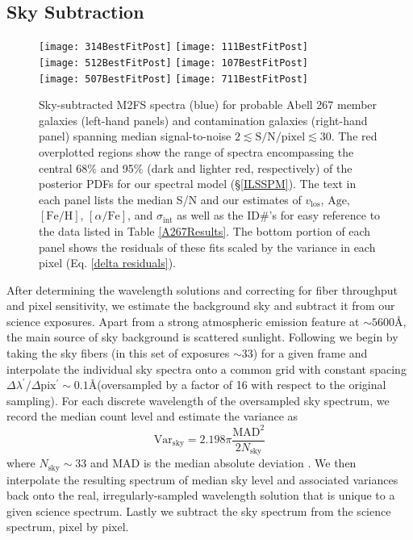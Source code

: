 \documentclass[twocolumn]{aastex6}
\def\feh{\mathrm{[Fe/H]}}
\def\afe{[\alpha/\mathrm{Fe}]}
\def\vlos{v_\mathrm{los}}
\def\disp{\sigma_\mathrm{int}}
\begin{document}
\subsection{Sky Subtraction}
\label{sky subtraction}

\begin{figure*}
\centering
\texttt{[image: 314BestFitPost]}
\texttt{[image: 111BestFitPost]}\\
\texttt{[image: 512BestFitPost]}
\texttt{[image: 107BestFitPost]}\\
\texttt{[image: 507BestFitPost]}
\texttt{[image: 711BestFitPost]}
\caption{Sky-subtracted M2FS spectra (blue) for probable Abell 267 member galaxies (left-hand panels) and contamination galaxies (right-hand panel) spanning median signal-to-noise $2\lesssim\mathrm{S/N/pixel}\lesssim30$. The red overplotted regions show the range of spectra encompassing the central 68\% and 95\% (dark and lighter red, respectively) of the posterior PDFs for our spectral model (\S\ref{ILSSPM}).  The text in each panel lists the median S/N and our estimates of $\vlos$, $\mathrm{Age}$, $\feh$, $\afe$, and $\disp$ as well as the ID\#'s for easy reference to the data listed in Table \ref{A267Results}. The bottom portion of each panel shows the residuals of these fits scaled by the variance in each pixel (Eq. \ref{delta residuals}).}
\label{A267BestFits}
\end{figure*}

After determining the wavelength solutions and correcting for fiber throughput and pixel sensitivity, we estimate the background sky and subtract it from our science exposures.
Apart from a strong atmospheric emission feature at $\sim5600$\AA, the main source of sky background is scattered sunlight.
Following \citet{Koposov2011} we begin by taking the sky fibers (in this set of exposures $\sim33$) for a given frame and interpolate the individual sky spectra onto a common grid with constant spacing $\Delta\lambda^\prime/\Delta\mathrm{pix}^\prime\sim0.1$\AA (oversampled by a factor of 16 with respect to the original sampling).
For each discrete wavelength of the oversampled sky spectrum, we record the median count level and estimate the variance as
\begin{equation}
\label{skyvar}
\mathrm{Var_{sky}}=2.198\pi\frac{\mathrm{MAD}^2}{2N_\mathrm{sky}}
\end{equation}
where $N_\mathrm{sky}\sim33$ and $\mathrm{MAD}$ is the median absolute deviation \citep{Rousseeuw1993}.
We then interpolate the resulting spectrum of median sky level and associated variances back onto the real, irregularly-sampled wavelength solution that is unique to a given science spectrum.
Lastly we subtract the sky spectrum from the science spectrum, pixel by pixel.
\end{document}

